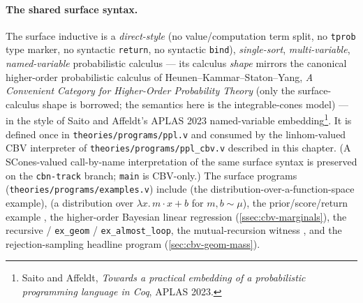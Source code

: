 \paragraph{The shared surface syntax.}
The surface inductive  is a
\emph{direct-style} (no value/computation term split, no \texttt{tprob}
type marker, no syntactic \texttt{return}, no syntactic \texttt{bind}),
\emph{single-sort}, \emph{multi-variable}, \emph{named-variable}
probabilistic calculus --- its calculus \emph{shape} mirrors the
canonical higher-order probabilistic calculus of
Heunen--Kammar--Staton--Yang, \emph{A Convenient Category for
Higher-Order Probability Theory} (only the surface-calculus shape is
borrowed; the semantics here is the integrable-cones model) --- in
the style of Saito and Affeldt's APLAS 2023 named-variable
embedding\footnote{Saito and Affeldt, \emph{Towards a practical embedding
of a probabilistic programming language in Coq}, APLAS 2023.}. It is
defined once in \texttt{theories/programs/ppl.v} and consumed by the
linhom-valued CBV interpreter of
\texttt{theories/programs/ppl\_cbv.v} described in this chapter. (A
SCones-valued call-by-name interpretation of the same surface syntax
is preserved on the \texttt{cbn-track} branch; \texttt{main} is
CBV-only.) The surface programs
(\texttt{theories/programs/examples.v}) include
 (the
distribution-over-a-function-space example),
 (a distribution over
$\lambda x.\,m\cdot x + b$ for $m, b \sim \mu$), the
prior/score/return example
, the higher-order
Bayesian linear regression
(\autoref{ssec:cbv-marginals}), the recursive
 / \texttt{ex\_geom} /
\texttt{ex\_almost\_loop}, the mutual-recursion witness
, and the
rejection-sampling headline
program 
(\autoref{sec:cbv-geom-mass}).

